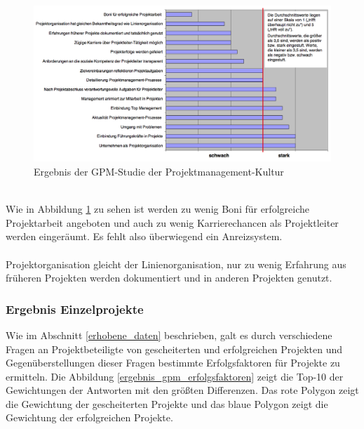 \documentclass[11pt]{scrartcl}
\begin{document}
\begin{figure}[H]
	\begin{center}
		\includegraphics[width=1.0\textwidth]{img/ergebnis_gpm_studie_kultur}
		\caption{Ergebnis der GPM-Studie der Projektmanagement-Kultur}
		\label{erfgebnis_gpm_studie_pmk}	
	\end{center}
\end{figure}
\ \\
Wie in Abbildung \ref{erfgebnis_gpm_studie_pmk} zu sehen ist werden zu wenig Boni für erfolgreiche Projektarbeit angeboten und auch zu wenig Karrierechancen als Projektleiter werden eingeräumt. Es fehlt also überwiegend ein Anreizsystem.\\
\\ 
Projektorganisation gleicht der Linienorganisation, nur zu wenig Erfahrung aus früheren Projekten werden dokumentiert und in anderen Projekten genutzt.

\subsubsection{Ergebnis Einzelprojekte}
\label{ergebnis_einzel}

Wie im Abschnitt \ref{erhobene_daten} beschrieben, galt es durch verschiedene Fragen an Projektbeteiligte von gescheiterten und erfolgreichen Projekten und Gegenüberstellungen dieser Fragen bestimmte Erfolgsfaktoren für Projekte zu ermitteln. Die Abbildung \ref{ergebnis_gpm_erfolgsfaktoren} zeigt die Top-10 der Gewichtungen der Antworten mit den größten Differenzen. Das rote Polygon zeigt die Gewichtung der gescheiterten Projekte und das blaue Polygon zeigt die Gewichtung der erfolgreichen Projekte. 
\end{document}
